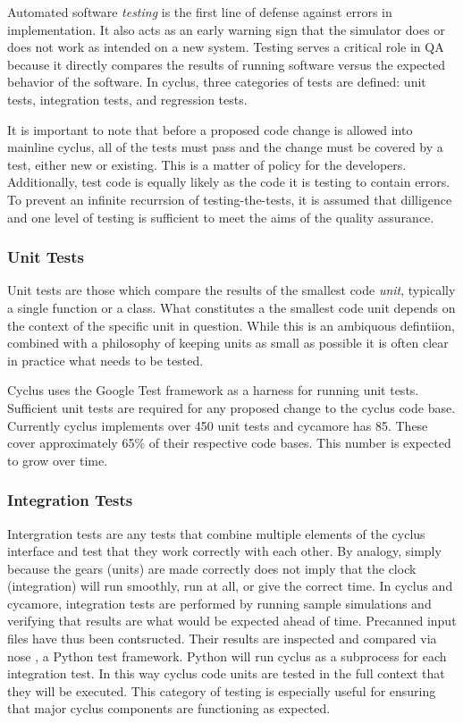 Automated software \emph{testing} is the first line of defense against
errors in implementation. It also acts as an early warning sign that the
simulator does or does not work as intended on a new system.
Testing serves a critical role in QA because it directly compares the 
results of running software versus the expected behavior of the software.
In cyclus, three categories of tests are defined: unit tests, integration 
tests, and regression tests. 

It is important to note that before a proposed
code change is allowed into mainline cyclus, all of the tests must pass
and the change must be covered by a test, either new or existing. This is a
matter of policy for the developers. Additionally, test code is equally likely 
as the code it is testing to contain errors. To prevent an infinite recurrsion 
of testing-the-tests, it is assumed that dilligence and one level of testing 
is sufficient to meet the aims of the quality assurance.

\subsubsection{Unit Tests}

Unit tests are those which compare the results of the smallest code \emph{unit}, 
typically a single function or a class. What constitutes a the smallest code
unit depends on the context of the specific unit in question. While this is 
an ambiquous defintiion, combined with a philosophy of keeping units as small
as possible it is often clear in practice what needs to be tested.

Cyclus uses the Google Test framework \cite{inc_googletest_2008} as a harness for running unit 
tests. Sufficient unit tests are required for any proposed change to the cyclus
code base. Currently cyclus implements over 450 unit tests and cycamore has 
85.  These cover approximately 65\% of their respective code bases. This number 
is expected to grow over time. 

\subsubsection{Integration Tests} 

Intergration tests are any tests that combine multiple elements of the 
cyclus interface and test that they work correctly with each other.  By analogy, 
simply because the gears (units) are made correctly does not imply that the 
clock (integration) will run smoothly, run at all, or give the correct time.
In cyclus and cycamore, integration tests are performed by running sample
simulations and verifying that results are what would be expected ahead of 
time. Precanned input files have thus been contsructed. Their results 
are inspected and compared via nose \cite{pellerin_nose_2007}, a Python test framework.
Python will run cyclus as a subprocess for each integration test. In this
way cyclus code units are tested in the full context that they will be
executed. This category of testing is especially useful for ensuring that 
major cyclus components are functioning as expected.

